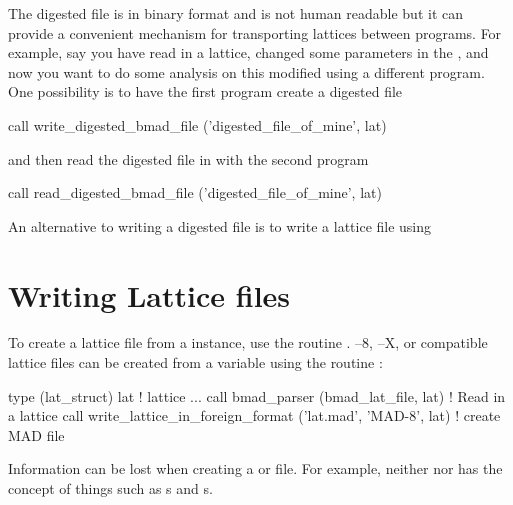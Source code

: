  The digested file is in binary
format and is not human readable but it can provide a convenient mechanism for transporting lattices
between programs. For example, say you have read in a lattice, changed some parameters in the
, and now you want to do some analysis on this modified  using a
different program.  One possibility is to have the first program create a digested file
\begin{example}
  call write_digested_bmad_file ('digested_file_of_mine', lat)
\end{example}
and then read the digested file in with the second program
\begin{example}
  call read_digested_bmad_file ('digested_file_of_mine', lat)
\end{example}
An alternative to writing a digested file is to write a lattice file
using 

\section{Writing Lattice files}
\label{s:lat.write}

 To create a \bmad lattice file from a
 instance, use the routine
.  \mad--8, \mad--X, or 
compatible lattice files can be created from a  variable using the routine
:
\begin{example}
  type (lat_struct) lat             ! lattice
  ...
  call bmad_parser (bmad_lat_file, lat)               ! Read in a lattice
  call write_lattice_in_foreign_format ('lat.mad', 'MAD-8', lat)  ! create MAD file
\end{example}
Information can be lost when creating a \mad or  file.  For example, neither \mad nor
 has the concept of things such as s and s.

